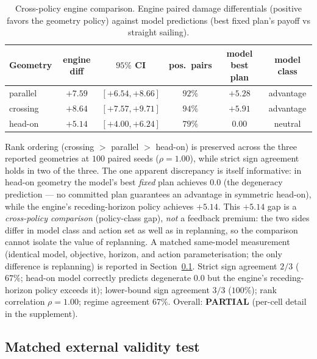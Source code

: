 \documentclass[12pt,a4paper]{article}
\begin{document}
\begin{table}[!htb]
\centering\small
\caption{Cross-policy engine comparison.  Engine paired damage differentials
(positive favors the geometry policy) against model predictions (best
fixed plan's payoff vs straight sailing).}
\label{tab:b13}
\begin{tabular}{lccccc}
\toprule
Geometry & engine diff & $95\%$ CI & pos.\ pairs & model best plan & model class \\
\midrule
parallel & $+7.59$ & $[+6.54,+8.66]$ & $92\%$ & $+5.28$ & advantage \\
crossing & $+8.64$ & $[+7.57,+9.71]$ & $94\%$ & $+5.91$ & advantage \\
head-on & $+5.14$ & $[+4.00,+6.24]$ & $79\%$ & $0.00$ & neutral \\
\bottomrule
\end{tabular}
\end{table}

Rank ordering (crossing $>$ parallel $>$ head-on) is preserved across the
three reported geometries at $100$ paired seeds ($\rho=1.00$), while strict
sign agreement holds in two of the three.  The one apparent discrepancy is itself
informative: in head-on geometry the model's best \emph{fixed} plan
achieves $0.0$ (the degeneracy prediction --- no committed plan guarantees
an advantage in symmetric head-on), while the engine's receding-horizon
policy achieves $+5.14$.  This $+5.14$ gap is a \emph{cross-policy
comparison} (policy-class gap), \emph{not} a feedback premium: the two
sides differ in model class and action set as well as in replanning, so
the comparison cannot isolate the value of replanning.  A matched
same-model measurement (identical model, objective, horizon, and action
parameterisation; the only difference is replanning) is reported in
Section~\ref{sec:matched}.
Strict sign agreement $2/3$ ($67\%$; head-on model correctly predicts
degenerate $0.0$ but the engine's receding-horizon policy exceeds it);
lower-bound sign agreement $3/3$ ($100\%$); rank correlation $\rho=1.00$;
regime agreement $67\%$.  Overall: \textbf{PARTIAL} (per-cell detail in
the supplement).

\subsection{Matched external validity test}\label{sec:matched}
\end{document}

